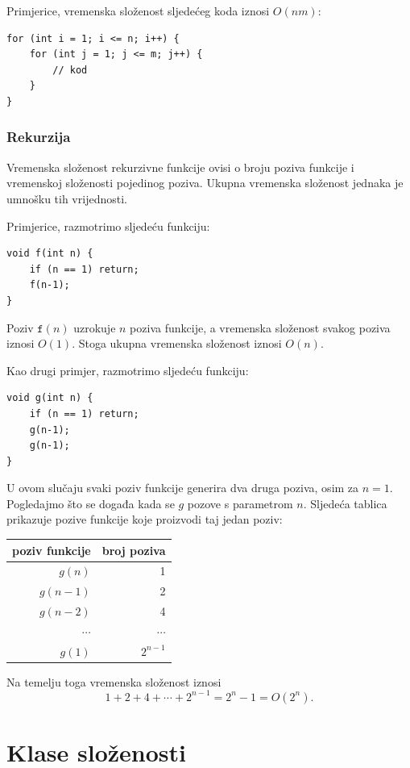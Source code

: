 Primjerice, vremenska složenost
sljedećeg koda iznosi $O(nm)$:

\begin{lstlisting}
for (int i = 1; i <= n; i++) {
    for (int j = 1; j <= m; j++) {
        // kod
    }
}
\end{lstlisting}

\subsubsection*{Rekurzija}

Vremenska složenost rekurzivne funkcije
ovisi o broju poziva funkcije
i vremenskoj složenosti pojedinog poziva.
Ukupna vremenska složenost jednaka je umnošku
tih vrijednosti.

Primjerice, razmotrimo sljedeću funkciju:
\begin{lstlisting}
void f(int n) {
    if (n == 1) return;
    f(n-1);
}
\end{lstlisting}
Poziv $\texttt{f}(n)$ uzrokuje $n$ poziva funkcije,
a vremenska složenost svakog poziva iznosi $O(1)$.
Stoga ukupna vremenska složenost iznosi $O(n)$.

Kao drugi primjer, razmotrimo sljedeću funkciju:
\begin{lstlisting}
void g(int n) {
    if (n == 1) return;
    g(n-1);
    g(n-1);
}
\end{lstlisting}
U ovom slučaju svaki poziv funkcije generira dva druga
poziva, osim za $n=1$.
Pogledajmo što se događa kada se $g$ pozove
s parametrom $n$.
Sljedeća tablica prikazuje pozive funkcije
koje proizvodi taj jedan poziv:
\begin{center}
\begin{tabular}{rr}
poziv funkcije & broj poziva \\
\hline
$g(n)$ & 1 \\
$g(n-1)$ & 2 \\
$g(n-2)$ & 4 \\
$\cdots$ & $\cdots$ \\
$g(1)$ & $2^{n-1}$ \\
\end{tabular}
\end{center}
Na temelju toga vremenska složenost iznosi
\[1+2+4+\cdots+2^{n-1} = 2^n-1 = O(2^n).\]

\section{Klase složenosti}


